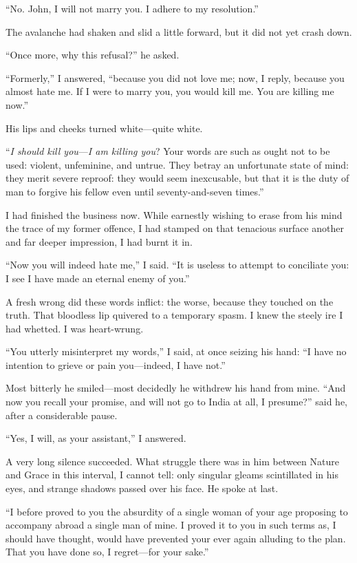 \enquote{No. \St{} John, I will not marry you. I adhere to my
	resolution.}

The avalanche had shaken and slid a little forward, but it did not yet
crash down.

\enquote{Once more, why this refusal?} he asked.

\enquote{Formerly,} I answered, \enquote{because you did not love me;
	now, I reply, because you almost hate me. If I were to marry you, you
	would kill me. You are killing me now.}

His lips and cheeks turned white---quite white.

\enquote{\emph{I should kill you}---\emph{I am killing you}? Your words are
	such as ought not to be used: violent, unfeminine, and untrue. They
	betray an unfortunate state of mind: they merit severe reproof: they
	would seem inexcusable, but that it is the duty of man to forgive his
	fellow even until seventy-and-seven times.}

I had finished the business now. While earnestly wishing to erase from
his mind the trace of my former offence, I had stamped on that tenacious
surface another and far deeper impression, I had burnt it in.

\enquote{Now you will indeed hate me,} I said. \enquote{It is useless
	to attempt to conciliate you: I see I have made an eternal enemy of
	you.}

A fresh wrong did these words inflict: the worse, because they touched
on the truth. That bloodless lip quivered to a temporary spasm. I knew
the steely ire I had whetted. I was heart-wrung.

\enquote{You utterly misinterpret my words,} I said, at once seizing his
hand: \enquote{I have no intention to grieve or pain you---indeed, I
	have not.}

Most bitterly he smiled---most decidedly he withdrew his hand from
mine. \enquote{And now you recall your promise, and will not go to
	India at all, I presume?} said he, after a considerable pause.

\enquote{Yes, I will, as your assistant,} I answered.

A very long silence succeeded. What struggle there was in him between
Nature and Grace in this interval, I cannot tell: only singular gleams
scintillated in his eyes, and strange shadows passed over his face. He
spoke at last.

\enquote{I before proved to you the absurdity of a single woman of your
	age proposing to accompany abroad a single man of mine. I proved it to
	you in such terms as, I should have thought, would have prevented your
	ever again alluding to the plan. That you have done so, I regret---for
	your sake.}

